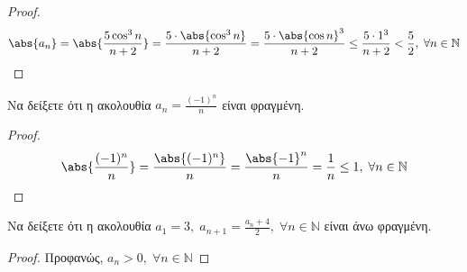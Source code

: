 \begin{enumerate}
        \begin{proof}
            \[
                \abs{a_{n}} = \abs{\frac{5 \cos^{3}{n}}{n+2}} = 
                \frac{5 \cdot \abs{\cos^{3}{n}}}{n+2} = \frac{5\cdot 
                \abs{\cos{n}}^ {3}}{n+2} \leq  \frac{5 \cdot 1^{3}}{n+2} < 
                \frac{5}{2}, \; \forall n \in \mathbb{N}
            \]
        \end{proof}




    \item Να δείξετε ότι η ακολουθία $ a_{n} = \frac{(-1)^{n}}{n} $ είναι 
        φραγμένη.

        \begin{proof}
            \[
                \abs{\frac{(-1)^{n}}{n}} = \frac{\abs{(-1)^{n}}}{n} = 
                \frac{\abs{-1}^{n}}{n} = \frac{1}{n} \leq 1, \; \forall n \in 
                \mathbb{N} 
            \] 
        \end{proof}



    \item Να δείξετε ότι η ακολουθία $ a_{1} = 3, \; a_{n+1} =
        \frac{a_{n}+4}{2}, \; \forall n \in \mathbb{N} $ είναι άνω φραγμένη.

        \begin{proof}
        \item {}
            Προφανώς, $ a_{n} > 0, \; \forall n \in \mathbb{N} $ 


\end{proof}
\end{enumerate}
